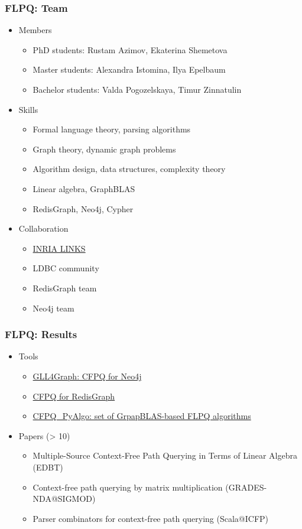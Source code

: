 \documentclass[xcolor=table,aspectratio=169]{beamer}
\begin{document}
\begin{frame}[fragile]
  \frametitle{FLPQ: Team}
  \begin{itemize}
    \item Members 
    \begin{itemize}
      \item PhD students: Rustam Azimov, Ekaterina Shemetova
      \item Master students: Alexandra Istomina, Ilya Epelbaum
      \item Bachelor students: Valda Pogozelskaya, Timur Zinnatulin
    \end{itemize} 
    \item Skills 
    \begin{itemize}
      \item Formal language theory, parsing algorithms
      \item Graph theory, dynamic graph problems
      \item Algorithm design, data structures, complexity theory
      \item Linear algebra, GraphBLAS
      \item RedisGraph, Neo4j, Cypher
    \end{itemize}
    \item Collaboration
    \begin{itemize}
      \item \href{https://team.inria.fr/links/}{INRIA LINKS}
      \item LDBC community
      \item RedisGraph team
      \item Neo4j team
    \end{itemize}
  \end{itemize}
\end{frame}

\begin{frame}[fragile]
  \frametitle{FLPQ: Results}
    \begin{itemize}
      \item Tools
      \begin{itemize}
        \item \href{https://github.com/JetBrains-Research/GLL4Graph}{GLL4Graph: CFPQ for Neo4j}
        \item \href{https://github.com/YaccConstructor/RedisGraph}{CFPQ for RedisGraph}
        \item \href{https://github.com/JetBrains-Research/CFPQ_PyAlgo}{CFPQ\_PyAlgo: set of GrpapBLAS-based FLPQ algorithms}
      \end{itemize}
      \item Papers (> 10)
      \begin{itemize}
        \item Multiple-Source Context-Free Path Querying in Terms of Linear Algebra (EDBT)
        \item Context-free path querying by matrix multiplication (GRADES-NDA@SIGMOD)
        \item Parser combinators for context-free path querying (Scala@ICFP)
      \end{itemize} 
    \end{itemize}
\end{frame}
\end{document}
